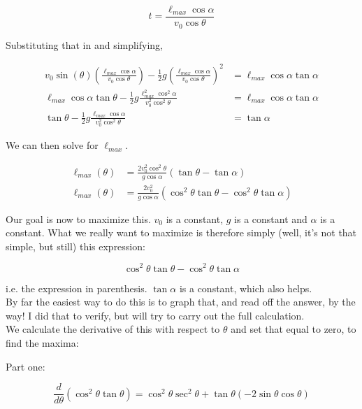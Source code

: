 \documentclass[8.01x]{subfiles}
\begin{document}
\begin{equation}
t = \frac{\ell_{max} \cos \alpha}{v_0 \cos \theta}
\end{equation}

Substituting that in and simplifying,

\begin{align}
v_0 \sin (\theta) \left(\frac{\ell_{max} \cos \alpha}{v_0 \cos \theta}\right) - \frac{1}{2} g \left(\frac{\ell_{max} \cos \alpha}{v_0 \cos \theta}\right)^2 &= \ell_{max} \cos \alpha \tan \alpha\\
\ell_{max} \cos \alpha \tan \theta - \frac{1}{2} g \frac{\ell_{max}^2 \cos^2 \alpha}{v_0^2 \cos^2 \theta} &= \ell_{max} \cos \alpha \tan \alpha\\
\tan \theta - \frac{1}{2} g \frac{\ell_{max} \cos \alpha}{v_0^2 \cos^2 \theta} &= \tan \alpha
\end{align}

We can then solve for $\ell_{max}$.

\begin{align}
\ell_{max}(\theta) &= \frac{2 v_0^2 \cos^2 \theta}{g \cos \alpha} \left(\tan \theta - \tan \alpha\right)\\
\ell_{max}(\theta) &= \frac{2 v_0^2}{g \cos \alpha} \left(\cos^2 \theta \tan \theta - \cos^2 \theta \tan \alpha\right)
\end{align}

Our goal is now to maximize this. $v_0$ is a constant, $g$ is a constant and $\alpha$ is a constant. What we really want to maximize is therefore simply (well, it's not that simple, but still) this expression:

\begin{equation}
\cos^2 \theta \tan \theta - \cos^2 \theta \tan \alpha
\end{equation}

i.e. the expression in parenthesis. $\tan \alpha$ is a constant, which also helps.\\
By far the easiest way to do this is to graph that, and read off the answer, by the way! I did that to verify, but will try to carry out the full calculation.\\
We calculate the derivative of this with respect to $\theta$ and set that equal to zero, to find the maxima:

Part one:

\begin{equation}
\frac{d}{d\theta} \left(\cos^2 \theta \tan \theta\right) = \cos^2\theta \sec^2 \theta + \tan \theta ( -2 \sin\theta \cos \theta)
\end{equation}
\end{document}
